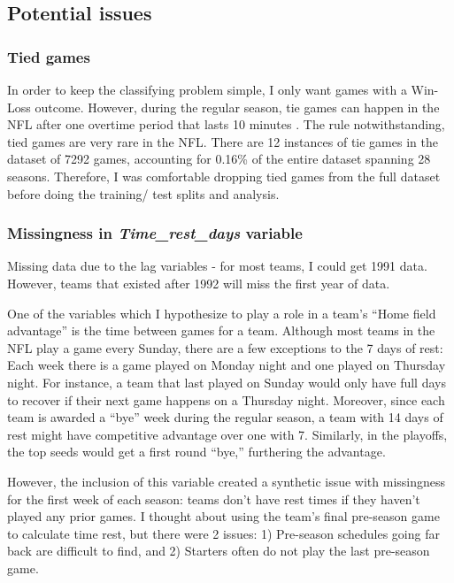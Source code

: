 \documentclass[12pt, letterpaper, twoside]{article}
\begin{document}
\subsection{Potential issues}

\subsubsection{Tied games}

In order to keep the classifying problem simple, I only want games with a Win-Loss outcome. However, during the regular season, tie games can happen in the NFL after one overtime period that lasts 10 minutes \citep{tie}. The rule notwithstanding, tied games are very rare in the NFL. There are 12 instances of tie games in the dataset of 7292 games, accounting for 0.16\% of the entire dataset spanning 28 seasons. Therefore, I was comfortable dropping tied games from the full dataset before doing the training/ test splits and analysis.

\subsubsection{Missingness in \textit{Time\_rest\_days} variable} \label{missing}

Missing data due to the lag variables - for most teams, I could get 1991 data. However, teams that existed after 1992 will miss the first year of data.
 
One of the variables which I hypothesize to play a role in a team's ``Home field advantage'' is the time between games for a team. Although most teams in the NFL play a game every Sunday, there are a few exceptions to the 7 days of rest: Each week there is a game played on Monday night and one played on Thursday night. For instance, a team that last played on Sunday would only have full days to recover if their next game happens on a Thursday night. Moreover, since each team is awarded a ``bye'' week during the regular season, a team with 14 days of rest might have competitive advantage over one with 7. Similarly, in the playoffs, the top seeds would get a first round ``bye,'' furthering the advantage. 

However, the inclusion of this variable created a synthetic issue with missingness for the first week of each season: teams don't have rest times if they haven't played any prior games. I thought about using the team's final pre-season game to calculate time rest, but there were 2 issues: 1) Pre-season schedules going far back are difficult to find, and 2) Starters often do not play the last pre-season game. 
\end{document}
